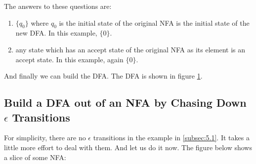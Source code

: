 \documentclass[11pt]{article}
\begin{document}
The answers to these questions are:
\begin{enumerate}
\item $\{q_0\}$ where $q_0$ is the initial state of the original NFA is the
initial state of the new DFA. In this example, $\{0\}$.
\item any state which has an accept state of the original NFA as its element
is an accept state. In this example, again $\{0\}$.
\end{enumerate}

And finally we can build the DFA. The DFA is shown in figure \ref{fig:fig15}.

\begin{figure}[ht]
    \centering
    \caption{}
    \label{fig:fig15}
\end{figure}

\subsection{Build a DFA out of an NFA by Chasing Down $\epsilon$ Transitions}

For simplicity, there are no $\epsilon$ transitions in the example in
\ref{subsec:5.1}. It takes a little more effort to deal with them. And let us
do it now. The figure below shows a slice of some NFA:

\begin{figure}[ht]
    \centering
    \caption{}
    \label{fig:fig16}
\end{figure}
\end{document}
